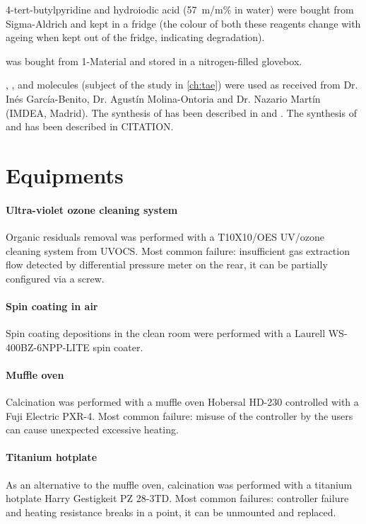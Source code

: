 	4-tert-butylpyridine and hydroiodic acid (57~m/m\% in water) were bought from Sigma-Aldrich and kept in a fridge (the colour of both these reagents change with ageing when kept out of the fridge, indicating degradation).

	\Spiro was bought from 1-Material and stored in a nitrogen-filled glovebox.

	, , and  molecules (subject of the study in \cref{ch:tae}) were used as received from Dr. Inés García-Benito, Dr. Agustín Molina-Ontoria and Dr. Nazario Martín (IMDEA, Madrid). The synthesis of  has been described in  and . The synthesis of  and  has been described in CITATION.
	
\section{Equipments}

	\paragraph{Ultra-violet ozone cleaning system} Organic residuals removal was performed with a T10X10/OES UV/ozone cleaning system from UVOCS. Most common failure: insufficient gas extraction flow detected by differential pressure meter on the rear, it can be partially configured via a screw.

	\paragraph{Spin coating in air} Spin coating depositions in the clean room were performed with a Laurell WS-400BZ-6NPP-LITE spin coater.

	\paragraph{Muffle oven} Calcination was performed with a muffle oven Hobersal HD-230 controlled with a Fuji Electric PXR-4. Most common failure: misuse of the controller by the users can cause unexpected excessive heating.
	
	\paragraph{Titanium hotplate} As an alternative to the muffle oven, calcination was performed with a titanium hotplate Harry Gestigkeit PZ 28-3TD. Most common failures: controller failure and heating resistance breaks in a point, it can be unmounted and replaced.

